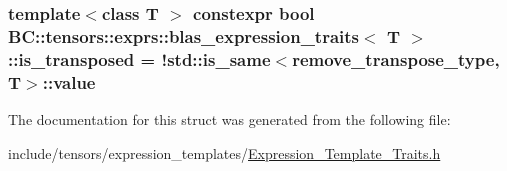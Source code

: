 \subsubsection[{\texorpdfstring{is\+\_\+transposed}{is_transposed}}]{\setlength{\rightskip}{0pt plus 5cm}template$<$class T $>$ constexpr bool {\bf B\+C\+::tensors\+::exprs\+::blas\+\_\+expression\+\_\+traits}$<$ T $>$\+::is\+\_\+transposed = !std\+::is\+\_\+same$<${\bf remove\+\_\+transpose\+\_\+type}, T$>$\+::value\hspace{0.3cm}{\ttfamily [static]}}\hypertarget{structBC_1_1tensors_1_1exprs_1_1blas__expression__traits_a038605b8d8a7a49c82e6e5eb167e63be}{}\label{structBC_1_1tensors_1_1exprs_1_1blas__expression__traits_a038605b8d8a7a49c82e6e5eb167e63be}


The documentation for this struct was generated from the following file\+:\begin{DoxyCompactItemize}
\item 
include/tensors/expression\+\_\+templates/\hyperlink{Expression__Template__Traits_8h}{Expression\+\_\+\+Template\+\_\+\+Traits.\+h}\end{DoxyCompactItemize}

